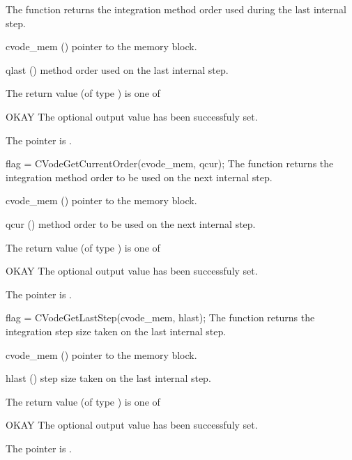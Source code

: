 {
  The function  returns the
  integration method order used during the last internal step.
}
{
  \begin{args}
  \item[cvode\_mem] ()
    pointer to the {\cvode} memory block.
  \item[qlast] ()
    method order used on the last internal step.
  \end{args}
}
{
  The return value  (of type ) is one of
  \begin{args}
  \item[OKAY] 
    The optional output value has been successfuly set.
  \item[\Id{CVG\_NO\_MEM}]
    The  pointer is .
  \end{args}
}
{}
{
  flag = CVodeGetCurrentOrder(cvode\_mem, qcur);
}
{
  The function  returns the
  integration method order to be used on the next internal step.
}
{
  \begin{args}
  \item[cvode\_mem] ()
    pointer to the {\cvode} memory block.
  \item[qcur] ()
    method order to be used on the next internal step.
  \end{args}
}
{
  The return value  (of type ) is one of
  \begin{args}
  \item[OKAY] 
    The optional output value has been successfuly set.
  \item[\Id{CVG\_NO\_MEM}]
    The  pointer is .
  \end{args}
}
{}
{
  flag = CVodeGetLastStep(cvode\_mem, hlast);
}
{
  The function  returns the
  integration step size taken on the last internal step.
}
{
  \begin{args}
  \item[cvode\_mem] ()
    pointer to the {\cvode} memory block.
  \item[hlast] ()
    step size taken on the last internal step.
  \end{args}
}
{
  The return value  (of type ) is one of
  \begin{args}
  \item[OKAY] 
    The optional output value has been successfuly set.
  \item[\Id{CVG\_NO\_MEM}]
    The  pointer is .
  \end{args}
}
